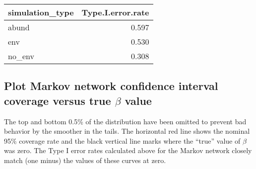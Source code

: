 \documentclass[11pt,]{article}
\newenvironment{Shaded}{\begin{snugshade}}{\end{snugshade}}
\newcommand{\KeywordTok}[1]{\textcolor[rgb]{0.13,0.29,0.53}{\textbf{{#1}}}}
\newcommand{\DataTypeTok}[1]{\textcolor[rgb]{0.13,0.29,0.53}{{#1}}}
\newcommand{\DecValTok}[1]{\textcolor[rgb]{0.00,0.00,0.81}{{#1}}}
\newcommand{\StringTok}[1]{\textcolor[rgb]{0.31,0.60,0.02}{{#1}}}
\newcommand{\NormalTok}[1]{{#1}}
\begin{document}
\begin{Shaded}
\end{Shaded}

\begin{longtable}[c]{@{}lr@{}}
\toprule
simulation\_type & Type.I.error.rate\tabularnewline
\midrule
\endhead
abund & 0.597\tabularnewline
env & 0.530\tabularnewline
no\_env & 0.308\tabularnewline
\bottomrule
\end{longtable}

\subsection{\texorpdfstring{Plot Markov network confidence interval
coverage versus true \(\beta\)
value}{Plot Markov network confidence interval coverage versus true \textbackslash{}beta value}}\label{plot-markov-network-confidence-interval-coverage-versus-true-beta-value}

The top and bottom 0.5\% of the distribution have been omitted to
prevent bad behavior by the smoother in the tails. The horizontal red
line shows the nominal 95\% coverage rate and the black vertical line
marks where the ``true'' value of \(\beta\) was zero. The Type I error
rates calculated above for the Markov network closely match (one minus)
the values of these curves at zero.
\end{document}
